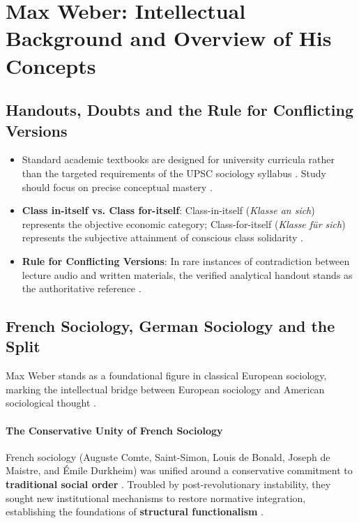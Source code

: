 \sectiondivider


\section{Max Weber: Intellectual Background and Overview of His Concepts}

\subsection{Handouts, Doubts and the Rule for Conflicting Versions}

\begin{CriticalPoint}
\begin{itemize}
    \item Standard academic textbooks are designed for university curricula rather than the targeted requirements of the UPSC sociology syllabus . Study should focus on precise conceptual mastery .
    \item \textbf{Class in-itself vs. Class for-itself}: Class-in-itself (\textit{Klasse an sich}) represents the objective economic category; Class-for-itself (\textit{Klasse f\"ur sich}) represents the subjective attainment of conscious class solidarity .
    \item \textbf{Rule for Conflicting Versions}: In rare instances of contradiction between lecture audio and written materials, the verified analytical handout stands as the authoritative reference .
\end{itemize}
\end{CriticalPoint}

\subsection{French Sociology, German Sociology and the Split}

Max Weber stands as a foundational figure in classical European sociology, marking the intellectual bridge between European sociology and American sociological thought .

\paragraph{The Conservative Unity of French Sociology}
French sociology (Auguste Comte, Saint-Simon, Louis de Bonald, Joseph de Maistre, and \'Emile Durkheim) was unified around a conservative commitment to \textbf{traditional social order} . Troubled by post-revolutionary instability, they sought new institutional mechanisms to restore normative integration, establishing the foundations of \textbf{structural functionalism} .

